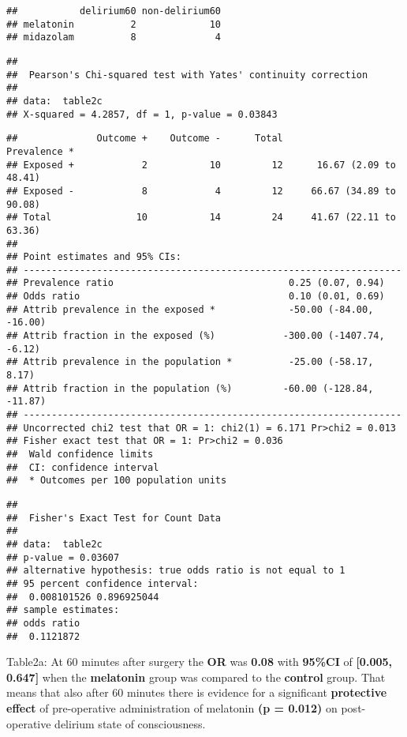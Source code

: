 \documentclass[
]{article}
\begin{document}
\begin{verbatim}
##           delirium60 non-delirium60
## melatonin          2             10
## midazolam          8              4
\end{verbatim}

\begin{verbatim}
## 
##  Pearson's Chi-squared test with Yates' continuity correction
## 
## data:  table2c
## X-squared = 4.2857, df = 1, p-value = 0.03843
\end{verbatim}

\begin{verbatim}
##              Outcome +    Outcome -      Total               Prevalence *
## Exposed +            2           10         12      16.67 (2.09 to 48.41)
## Exposed -            8            4         12     66.67 (34.89 to 90.08)
## Total               10           14         24     41.67 (22.11 to 63.36)
## 
## Point estimates and 95% CIs:
## -------------------------------------------------------------------
## Prevalence ratio                               0.25 (0.07, 0.94)
## Odds ratio                                     0.10 (0.01, 0.69)
## Attrib prevalence in the exposed *             -50.00 (-84.00, -16.00)
## Attrib fraction in the exposed (%)            -300.00 (-1407.74, -6.12)
## Attrib prevalence in the population *          -25.00 (-58.17, 8.17)
## Attrib fraction in the population (%)         -60.00 (-128.84, -11.87)
## -------------------------------------------------------------------
## Uncorrected chi2 test that OR = 1: chi2(1) = 6.171 Pr>chi2 = 0.013
## Fisher exact test that OR = 1: Pr>chi2 = 0.036
##  Wald confidence limits
##  CI: confidence interval
##  * Outcomes per 100 population units
\end{verbatim}

\begin{verbatim}
## 
##  Fisher's Exact Test for Count Data
## 
## data:  table2c
## p-value = 0.03607
## alternative hypothesis: true odds ratio is not equal to 1
## 95 percent confidence interval:
##  0.008101526 0.896925044
## sample estimates:
## odds ratio 
##  0.1121872
\end{verbatim}

Table2a: At 60 minutes after surgery the \textbf{OR} was \textbf{0.08}
with \textbf{95\%CI} of \textbf{{[}0.005, 0.647{]}} when the
\textbf{melatonin} group was compared to the \textbf{control} group.
That means that also after 60 minutes there is evidence for a
significant \textbf{protective effect} of pre-operative administration
of melatonin \textbf{(p = 0.012)} on post-operative delirium state of
consciousness.
\end{document}
